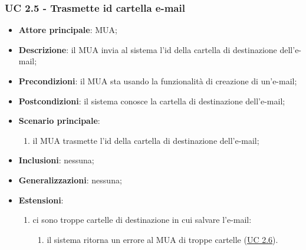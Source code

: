     \subsubsection{UC 2.5 - Trasmette id cartella e-mail} \label{sec:UC2.5}
    \begin{itemize}
        \item \textbf{Attore principale}: MUA;
        \item \textbf{Descrizione}: il MUA invia al sistema l'id della cartella di destinazione dell'e-mail;
        \item \textbf{Precondizioni}: il MUA sta usando la funzionalità di creazione di un'e-mail;
        \item \textbf{Postcondizioni}: il sistema conosce la cartella di destinazione dell'e-mail;
        \item \textbf{Scenario principale}:
            \begin{enumerate}
                \item il MUA trasmette l'id della cartella di destinazione dell'e-mail;
            \end{enumerate}
        \item \textbf{Inclusioni}: nessuna;
        \item \textbf{Generalizzazioni}: nessuna;
        \item \textbf{Estensioni}:             
        \begin{enumerate}[label=\alph*.]
            \item ci sono troppe cartelle di destinazione in cui salvare l'e-mail:
            \begin{enumerate}[label=\arabic*.]
                \item il sistema ritorna un errore al MUA di troppe cartelle (\hyperref[sec:UC2.6]{UC 2.6}).
            \end{enumerate}
        \end{enumerate}
    \end{itemize}

